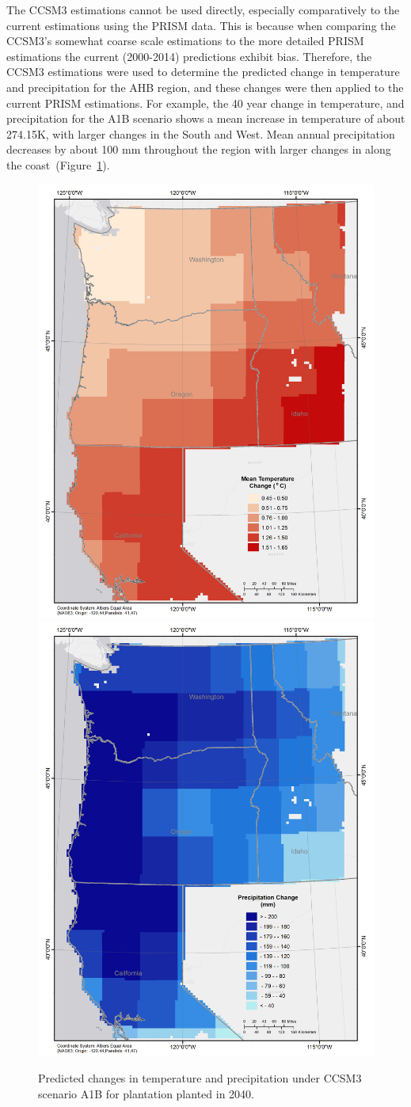 \documentclass[preprint,review,12pt]{elsarticle}
\begin{document}
The \ac{CCSM3} estimations cannot be used directly, especially
comparatively to the current estimations using the \ac{PRISM} data.
This is because when comparing the \ac{CCSM3}'s somewhat coarse scale
estimations to the more detailed \ac{PRISM} estimations the current
(2000-2014) predictions exhibit bias.  Therefore, the \ac{CCSM3}
estimations were used to determine the predicted change in temperature
and precipitation for the \ac {AHB} region, and these changes were
then applied to the current \ac{PRISM} estimations. For example, the
40 year change in temperature, and precipitation for the A1B scenario
shows a mean increase in temperature of about 274.15\degree K, with
larger changes in the South and West.  Mean annual precipitation
decreases by about 100 mm throughout the region with larger changes
in along the coast~(Figure~\ref{fig:change}).

\begin{figure}[hp]
  \centering
  \includegraphics[width=0.45\linewidth]{temp_change}
  \includegraphics[width=0.45\linewidth]{precip_change.png}
  \caption{Predicted changes in temperature and precipitation under \ac{CCSM3} scenario A1B for plantation planted in 2040.}
  \label{fig:change}
\end{figure}
\end{document}
